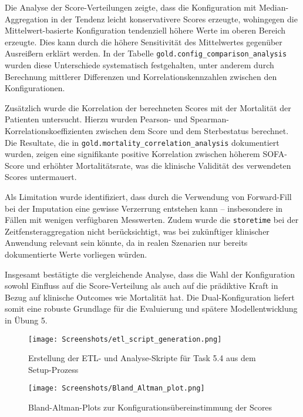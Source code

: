 \documentclass[12pt]{article}
\begin{document}
\noindent  Die Analyse der Score-Verteilungen zeigte, dass die Konfiguration mit Median-Aggregation in der Tendenz leicht konservativere Scores erzeugte, wohingegen die Mittelwert-basierte Konfiguration tendenziell höhere Werte im oberen Bereich erzeugte. Dies kann durch die höhere Sensitivität des Mittelwertes gegenüber Ausreißern erklärt werden. In der Tabelle \texttt{gold.config\_comparison\_analysis} wurden diese Unterschiede systematisch festgehalten, unter anderem durch Berechnung mittlerer Differenzen und Korrelationskennzahlen zwischen den Konfigurationen. 

\vspace{3mm} \noindent  Zusätzlich wurde die Korrelation der berechneten Scores mit der Mortalität der Patienten untersucht. Hierzu wurden Pearson- und Spearman-Korrelationskoeffizienten zwischen dem Score und dem Sterbestatus berechnet. Die Resultate, die in \nolinkurl{gold.mortality_correlation_analysis} dokumentiert wurden, zeigen eine signifikante positive Korrelation zwischen höherem SOFA-Score und erhöhter Mortalitätsrate, was die klinische Validität des verwendeten Scores untermauert.

\vspace{3mm} \noindent  Als Limitation wurde identifiziert, dass durch die Verwendung von Forward-Fill bei der Imputation eine gewisse Verzerrung entstehen kann – insbesondere in Fällen mit wenigen verfügbaren Messwerten. Zudem wurde die \texttt{storetime} bei der Zeitfensteraggregation nicht berücksichtigt, was bei zukünftiger klinischer Anwendung relevant sein könnte, da in realen Szenarien nur bereits dokumentierte Werte vorliegen würden.

\vspace{3mm} \noindent  Insgesamt bestätigte die vergleichende Analyse, dass die Wahl der Konfiguration sowohl Einfluss auf die Score-Verteilung als auch auf die prädiktive Kraft in Bezug auf klinische Outcomes wie Mortalität hat. Die Dual-Konfiguration liefert somit eine robuste Grundlage für die Evaluierung und spätere Modellentwicklung in Übung 5.


\begin{figure}[H]
    \centering
    \texttt{[image: Screenshots/etl\_script\_generation.png]}
    \caption{Erstellung der ETL- und Analyse-Skripte für Task 5.4 aus dem Setup-Prozess}
\end{figure}

\begin{figure}[H]
    \centering
    \texttt{[image: Screenshots/Bland\_Altman\_plot.png]}
    \caption{Bland-Altman-Plots zur Konfigurationsübereinstimmung der Scores}
\end{figure}
\end{document}

